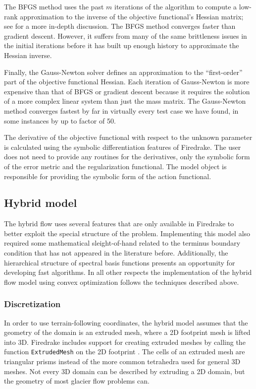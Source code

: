 \documentclass{article}
\theoremstyle{definition}
\theoremstyle{plain}
\begin{document}
The BFGS method uses the past $m$ iterations of the algorithm to compute a low-rank approximation to the inverse of the objective functional's Hessian matrix; see \citet{nocedal2006numerical} for a more in-depth discussion.
The BFGS method converges faster than gradient descent.
However, it suffers from many of the same brittleness issues in the initial iterations before it has built up enough history to approximate the Hessian inverse.

Finally, the Gauss-Newton solver defines an approximation to the ``first-order'' part of the objective functional Hessian.
Each iteration of Gauss-Newton is more expensive than that of BFGS or gradient descent because it requires the solution of a more complex linear system than just the mass matrix.
The Gauss-Newton method converges fastest by far in virtually every test case we have found, in some instances by up to factor of 50.

The derivative of the objective functional with respect to the unknown parameter is calculated using the symbolic differentiation features of Firedrake.
The user does not need to provide any routines for the derivatives, only the symbolic form of the error metric and the regularization functional.
The model object is responsible for providing the symbolic form of the action functional.


\subsection{Hybrid model}

The hybrid flow uses several features that are only available in Firedrake to better exploit the special structure of the problem.
Implementing this model also required some mathematical sleight-of-hand related to the terminus boundary condition that has not appeared in the literature before.
Additionally, the hierarchical structure of spectral basis functions presents an opportunity for developing fast algorithms.
In all other respects the implementation of the hybrid flow model using convex optimization follows the techniques described above.

\subsubsection{Discretization}

In order to use terrain-following coordinates, the hybrid model assumes that the geometry of the domain is an extruded mesh, where a 2D footprint mesh is lifted into 3D.
Firedrake includes support for creating extruded meshes by calling the function \texttt{ExtrudedMesh} on the 2D footprint \citep{bercea2016structure, mcrae2016automated}.
The cells of an extruded mesh are triangular prisms instead of the more common tetrahedra used for general 3D meshes.
Not every 3D domain can be described by extruding a 2D domain, but the geometry of most glacier flow problems can.
\end{document}
